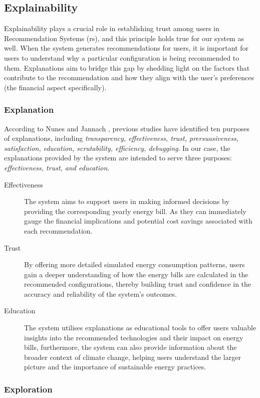 \subsection{Explainability}

Explainability plays a crucial role in establishing trust among users in Recommendation Systems (\gls{rs}), and this principle holds true for our system as well. 
When the system generates recommendations for users, it is important for users to understand why a particular configuration is being recommended to them. 
Explanations aim to bridge this gap by shedding light on the factors that contribute to the recommendation and how they align with the user's preferences (the financial aspect specifically). 


\subsubsection{Explanation}

According to Nunes and Jannach \cite{Nunes2020}, previous studies have identified ten purposes of explanations, including 
\emph{transparency, effectiveness, trust, prersuasiveness, satisfaction, education, scrutability, efficiency, debugging}.
In our case, the explanations provided by the system are intended to serve three purposes: 
\emph{effectiveness, trust, and education}. 
\begin{description}
  \item[Effectiveness] The system aims to support users in making informed decisions by providing the corresponding yearly energy bill. 
    As they can immediately gauge the financial implications and potential cost savings associated with each recommendation. 
  \item[Trust] By offering more detailed simulated energy consumption patterns, users gain a deeper understanding of how the energy bills are calculated in the recommended configurations, 
    thereby building trust and confidence in the accuracy and reliability of the system's outcomes.
  \item[Education] The system utilises explanations as educational tools to offer users valuable insights into the recommended technologies and their impact on energy bills, 
    furthermore, the system can also provide information about the broader context of climate change, helping users understand the larger picture and the importance of sustainable energy practices.
\end{description}


\subsubsection{Exploration}

